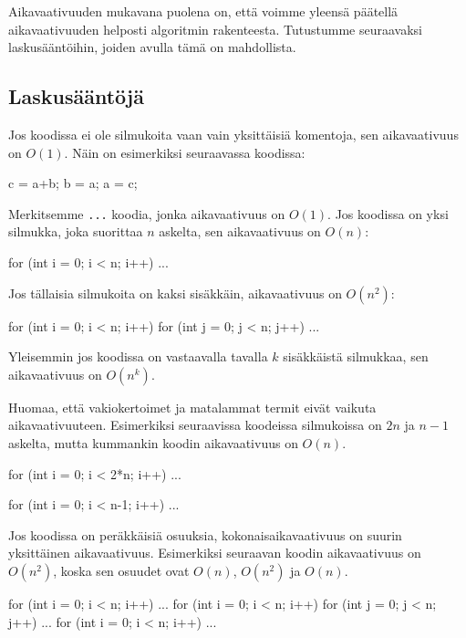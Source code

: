 Aikavaativuuden mukavana puolena on, että voimme yleensä
päätellä aikavaativuuden helposti algoritmin
rakenteesta. Tutustumme seuraavaksi laskusääntöihin,
joiden avulla tämä on mahdollista.

\subsection{Laskusääntöjä}

Jos koodissa ei ole silmukoita vaan vain
yksittäisiä komentoja, sen aikavaativuus on $O(1)$.
Näin on esimerkiksi seuraavassa koodissa:

\begin{code}
c = a+b;
b = a;
a = c;
\end{code}

Merkitsemme \texttt{...} koodia,
jonka aikavaativuus on $O(1)$.
Jos koodissa on yksi silmukka,
joka suorittaa $n$ askelta,
sen aikavaativuus on $O(n)$:

\begin{code}
for (int i = 0; i < n; i++) {
    ...
}
\end{code}

Jos tällaisia silmukoita on kaksi sisäkkäin,
aikavaativuus on $O(n^2)$:

\begin{code}
for (int i = 0; i < n; i++) {
    for (int j = 0; j < n; j++) {
        ...
    }
}
\end{code}

Yleisemmin jos koodissa on vastaavalla tavalla
$k$ sisäkkäistä silmukkaa, sen aikavaativuus on $O(n^k)$.

Huomaa, että vakiokertoimet ja matalammat termit eivät vaikuta aikavaativuuteen.
Esimerkiksi seuraavissa koodeissa silmukoissa on $2n$ ja $n-1$ askelta,
mutta kummankin koodin aikavaativuus on $O(n)$.

\begin{code}
for (int i = 0; i < 2*n; i++) {
    ...
}
\end{code}

\begin{code}
for (int i = 0; i < n-1; i++) {
    ...
}
\end{code}

Jos koodissa on peräkkäisiä osuuksia, kokonaisaikavaativuus on suurin
yksittäinen aikavaativuus. Esimerkiksi seuraavan koodin aikavaativuus on $O(n^2)$,
koska sen osuudet ovat $O(n)$, $O(n^2)$ ja $O(n)$.

\begin{code}
for (int i = 0; i < n; i++) {
    ...
}
for (int i = 0; i < n; i++) {
    for (int j = 0; j < n; j++) {
        ...
    }
}
for (int i = 0; i < n; i++) {
    ...
}
\end{code}

